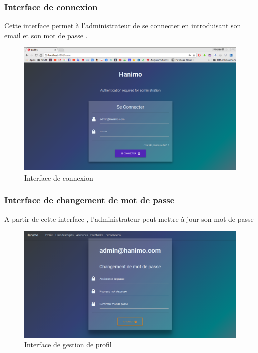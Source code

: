 \documentclass[11pt,a4paper,oneside]{book}
\begin{document}
					\subsubsection{Interface de connexion}
					Cette interface permet à l’administrateur de se connecter en introduisant son email et son mot de passe .
					\begin{figure}[H]
						\centering
						\includegraphics[width=1\textwidth]{"newest maquettes/Phase de connexion"}
						\caption{Interface de connexion}
						\label{fig:phase-de-connexion}
					\end{figure}
					\subsubsection{Interface de changement de mot de passe}
					A partir de cette interface , l’administrateur peut mettre à jour son mot de passe 
					\begin{figure}[H]
						\centering
						\includegraphics[width=1\textwidth]{"newest maquettes/changement de mot de passe"}
						\caption{Interface de gestion de profil}
						\label{fig:changement-de-mot-de-passe}
					\end{figure}
\end{document}
